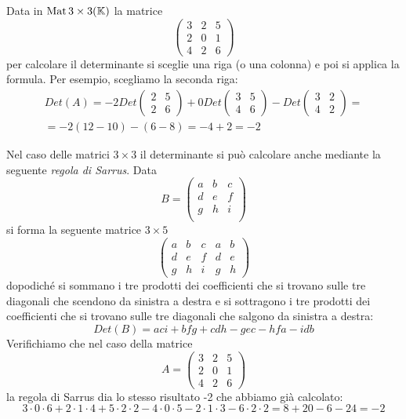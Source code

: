 \begin{example}
	Data in $\operatorname{Mat}{3 \times 3}(\mathbb{K})$ la matrice
	\[
		\begin{pmatrix}
			3 & 2 & 5 \\
			2 & 0 & 1 \\
			4 & 2 & 6
		\end{pmatrix}
	\]
	per calcolare il determinante si sceglie una riga (o una colonna) e poi si
	applica la formula. Per esempio, scegliamo la seconda riga:
	\begin{gather*}
		Det(A) = -2Det \begin{pmatrix}
			2 & 5 \\
			2 & 6
		\end{pmatrix} +
		0 Det \begin{pmatrix}
			3 & 5 \\
			4 & 6
		\end{pmatrix} -
		Det \begin{pmatrix}
			3 & 2 \\
			4 & 2
		\end{pmatrix} = \\
		= -2(12 - 10) - (6 - 8) = -4 + 2 = -2
	\end{gather*}
\end{example}

\begin{observation}
	Nel caso delle matrici $3 \times 3$ il determinante si può calcolare
	anche mediante la seguente \emph{regola di Sarrus}. Data
	\[
		B = \begin{pmatrix}
			a & b & c \\
			d & e & f \\
			g & h & i \\
		\end{pmatrix}
	\]
	si forma la seguente matrice $3 \times 5$
	\[
		\begin{pmatrix}
			a & b & c & a & b \\
			d & e & f & d & e \\
			g & h & i & g & h
		\end{pmatrix}
	\]
	dopodiché si sommano i tre prodotti dei coefficienti che si trovano sulle
	tre diagonali che scendono da sinistra a destra e si sottragono i tre
	prodotti dei coefficienti che si trovano sulle tre diagonali che salgono
	da sinistra a destra:
	\[
		Det(B) = aci + bfg + cdh - gec - hfa - idb
	\]
	Verifichiamo che nel caso della matrice
	\[
		A = \begin{pmatrix}
			3 & 2 & 5 \\
			2 & 0 & 1 \\
			4 & 2 & 6
		\end{pmatrix}
	\]
	la regola di Sarrus dia lo stesso risultato -2 che abbiamo già calcolato:
	\[
		3 \cdot 0 \cdot 6 + 2 \cdot 1 \cdot 4 + 5 \cdot 2 \cdot 2 -
		4 \cdot 0 \cdot 5 - 2 \cdot 1 \cdot 3 - 6 \cdot 2 \cdot 2 =
		8 + 20 - 6 - 24 = -2
	\]
\end{observation}

